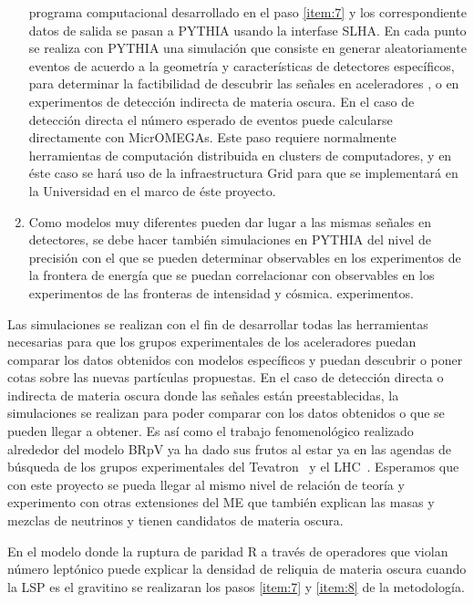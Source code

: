 \begin{enumerate}
  programa computacional desarrollado en el paso \ref{item:7} y los
  correspondiente datos de salida se pasan a PYTHIA usando la
  interfase SLHA. En cada punto se realiza con PYTHIA una simulación
  que consiste en generar aleatoriamente eventos de acuerdo a la
  geometría y características de detectores específicos, para
  determinar la factibilidad de descubrir las señales en aceleradores
  \cite{Magro:2003zb,deCampos:2005ri,deCampos:2007bn,deCampos:2008ic,deCampos:2008re},
  o en experimentos de detección indirecta \cite{Choi:2010xn} de
  materia oscura. En el caso de detección directa el número esperado
  de eventos puede calcularse directamente con MicrOMEGAs. Este paso
  requiere normalmente herramientas de computación distribuida en
  clusters de computadores, y en éste caso se hará uso de la
  infraestructura Grid para que se implementará en la Universidad en
  el marco de éste proyecto.
  \label{item:8}
\item Como modelos muy diferentes pueden dar lugar a las mismas
  señales en detectores, se debe hacer también simulaciones en PYTHIA
  del nivel de precisión con el que se pueden determinar observables
  en los experimentos de la frontera de energía que se puedan
  correlacionar con observables en los experimentos de las fronteras
  de intensidad y cósmica.
  experimentos.
  \label{item:9}
\end{enumerate}

Las simulaciones se realizan con el fin de desarrollar todas las
herramientas necesarias para que los grupos experimentales de los
aceleradores puedan comparar los datos obtenidos con modelos
específicos y puedan descubrir o poner cotas sobre las nuevas
partículas propuestas. En el caso de detección directa o indirecta de
materia oscura donde las señales están preestablecidas, la
simulaciones se realizan para poder comparar con los datos obtenidos o
que se pueden llegar a obtener. Es así como el trabajo fenomenológico
realizado alrededor del modelo BRpV ya ha dado sus frutos al estar ya
en las agendas de búsqueda de los grupos experimentales del
Tevatron~\cite{Brigliadori:2008vf} y el LHC~\cite{:2011iu}. Esperamos
que con este proyecto se pueda llegar al mismo nivel de relación de
teoría y experimento con otras extensiones del ME que
también explican las masas y mezclas de neutrinos y tienen candidatos
de materia oscura.



\begin{gravitinodm}
  En el modelo donde la ruptura de paridad R a través de operadores
  que violan número leptónico puede explicar la densidad de reliquia
  de materia oscura cuando la LSP es el gravitino se realizaran los
  pasos \ref{item:7} y \ref{item:8} de la metodología.
\end{gravitinodm}

